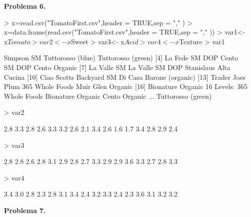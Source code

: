 \documentclass{article}
\begin{document}
\textbf{Problema 6.}
\begin{Schunk}
\begin{Sinput}
> x=read.csv("TomatoFirst.csv",header = TRUE,sep = "," )
> x=data.frame(read.csv("TomatoFirst.csv",header = TRUE,sep = "," ))
> var1<- x$Tomato
> var2<- x$Sweet
> var3<- x$Acid
> var4<- x$Texture
> var1
\end{Sinput}
\begin{Soutput}
 [1] Simpson SM               Tuttorosso (blue)        Tuttorosso (green)      
 [4] La Fede SM DOP           Cento SM DOP             Cento Organic           
 [7] La Valle SM              La Valle SM DOP          Stanislaus Alta Cucina  
[10] Ciao                     Scotts Backyard SM       Di Casa Barone (organic)
[13] Trader Joes Plum         365 Whole Foods          Muir Glen Organic       
[16] Bionature Organic       
16 Levels: 365 Whole Foods Bionature Organic Cento Organic ... Tuttorosso (green)
\end{Soutput}
\begin{Sinput}
> var2
\end{Sinput}
\begin{Soutput}
 [1] 2.8 3.3 2.8 2.6 3.3 3.2 2.6 2.1 3.4 2.6 1.6 1.7 3.4 2.8 2.9 2.4
\end{Soutput}
\begin{Sinput}
> var3
\end{Sinput}
\begin{Soutput}
 [1] 2.8 2.8 2.6 2.8 3.1 2.9 2.8 2.7 3.3 2.9 2.9 3.6 3.3 2.7 2.8 3.3
\end{Soutput}
\begin{Sinput}
> var4
\end{Sinput}
\begin{Soutput}
 [1] 3.4 3.0 2.8 2.3 2.8 3.1 3.4 2.4 3.2 3.3 2.4 2.3 3.6 3.1 3.2 3.2
\end{Soutput}
\end{Schunk}
\textbf{Problema 7.}
\end{document}
